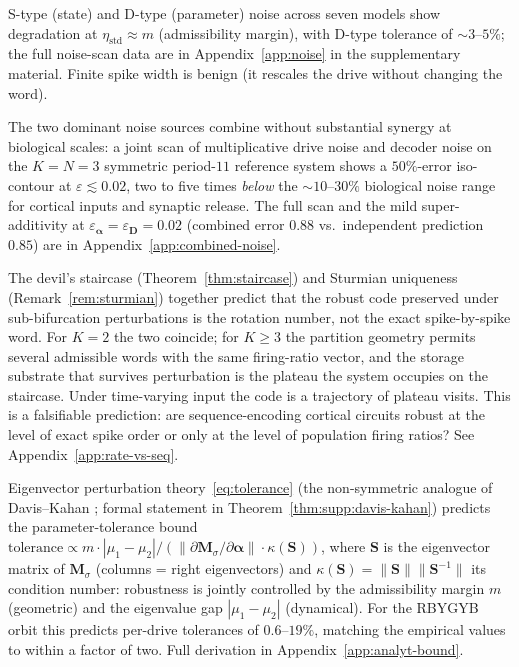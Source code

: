 \documentclass[12pt]{article}
\newcommand{\vv}[1]{\mathbf{#1}}
\begin{document}
 S-type (state) and D-type (parameter) noise across seven models show degradation at $\eta_{\text{std}}\approx m$ (admissibility margin), with D-type tolerance of ${\sim}3$--$5\%$; the full noise-scan data are in Appendix~\ref{app:noise} in the supplementary material. Finite spike width is benign (it rescales the drive without changing the word).

The two dominant noise sources combine without substantial synergy at biological scales: a joint scan of multiplicative drive noise and decoder noise on the $K=N=3$ symmetric period-$11$ reference system shows a $50\%$-error iso-contour at $\varepsilon\lesssim 0.02$, two to five times \emph{below} the ${\sim}10$--$30\%$ biological noise range for cortical inputs and synaptic release. The full scan and the mild super-additivity at $\varepsilon_{\boldsymbol{\alpha}}{=}\varepsilon_{\vv{D}}{=}0.02$ (combined error $0.88$ vs.\ independent prediction $0.85$) are in Appendix~\ref{app:combined-noise}.

The devil's staircase (Theorem~\ref{thm:staircase}) and Sturmian uniqueness (Remark~\ref{rem:sturmian}) together predict that the robust code preserved under sub-bifurcation perturbations is the rotation number, not the exact spike-by-spike word. For $K{=}2$ the two coincide; for $K\geq 3$ the partition geometry permits several admissible words with the same firing-ratio vector, and the storage substrate that survives perturbation is the plateau the system occupies on the staircase. Under time-varying input the code is a trajectory of plateau visits. This is a falsifiable prediction: are sequence-encoding cortical circuits robust at the level of exact spike order or only at the level of population firing ratios? See Appendix~\ref{app:rate-vs-seq}.

Eigenvector perturbation theory~\eqref{eq:tolerance} (the non-symmetric analogue of Davis--Kahan \citep{davis1970rotation,stewart1990matrix}; formal statement in Theorem~\ref{thm:supp:davis-kahan}) predicts the parameter-tolerance bound $\text{tolerance}\propto m\cdot|\mu_1{-}\mu_2|/(\|\partial\vv{M}_\sigma/\partial\boldsymbol{\alpha}\|\cdot\kappa(\vv{S}))$, where $\vv{S}$ is the eigenvector matrix of $\vv{M}_\sigma$ (columns = right eigenvectors) and $\kappa(\vv{S})=\|\vv{S}\|\|\vv{S}^{-1}\|$ its condition number: robustness is jointly controlled by the admissibility margin $m$ (geometric) and the eigenvalue gap $|\mu_1{-}\mu_2|$ (dynamical). For the RBYGYB orbit this predicts per-drive tolerances of $0.6$--$19\%$, matching the empirical values to within a factor of two. Full derivation in Appendix~\ref{app:analyt-bound}.
\end{document}
